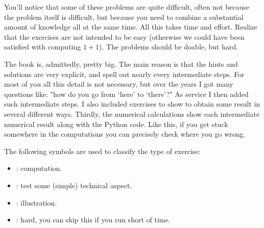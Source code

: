 You'll notice that some of these problems are quite difficult, often not because the problem itself is difficult, but because you need to combine a substantial amount of knowledge all at the same time.
All this takes time and effort.
Realize that the exercises are not intended to be easy (otherwise we could have been satisfied with computing $1+1$).
The problems should be doable, but hard.

The book is, admittedly, pretty big.
The main reason is that the hints and solutions are very explicit, and spell out nearly every intermediate steps.
For most of you all this detail is not necessary, but over the years I got many questions like: "how do you go from `here' to `there'?"
As service I then added such intermediate steps.
I also included exercises to show to obtain some result in several different ways. %
Thirdly, the numerical calculations show each intermediate numerical result along with the Python code.
Like this, if you get stuck somewhere in the computations you can precisely check where you go wrong.


The following symbols are used to classify the type of exercise:
\begin{itemize}
\item \faCalculator: computation.
\item \faFlask:  test some (simple) technical aspect.
\item \faPhoto: illustration.
\item \faRocket: hard, you can skip this if you run short of time. 
\end{itemize}




